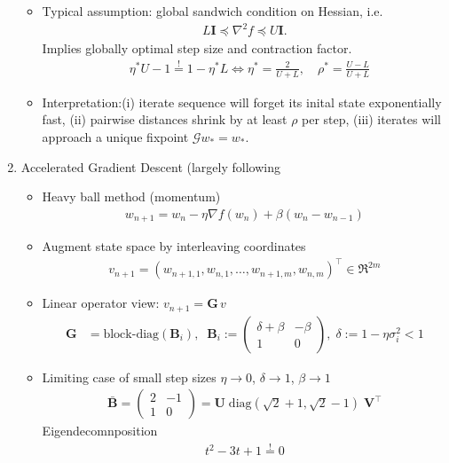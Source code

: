\documentclass{article}
\newcommand{\mI}{{\mathbf I}}
\newcommand{\mB}{{\mathbf B}}
\newcommand{\mG}{{\mathbf G}}
\newcommand{\mU}{{\mathbf U}}
\newcommand{\is}[1]{\setlength{\itemsep}{#1}}
\begin{document}
\begin{enumerate}
\begin{itemize}
\item Typical assumption: global sandwich condition on  Hessian, i.e.~
\begin{align}
L \mI \preceq \nabla^2 f \preceq U \mI.
\end{align}
Implies globally optimal step size and contraction factor. 
\begin{align}
& \eta^* U - 1 \stackrel != 1 - \eta^* L \iff \eta^* = \frac{2}{U+L}, \quad \rho^* = \frac{U-L}{U+L} 
\end{align}
\item Interpretation:(i) iterate sequence will forget its inital state exponentially fast, (ii) pairwise distances shrink by at least $\rho$ per step, (iii) iterates will approach a unique fixpoint $\mathcal G w_* = w_*$.
\end{itemize}
\item Accelerated Gradient Descent (largely following  \cite[Section VI]{jung2017fixed} 
\begin{itemize}\is{2mm}
\item Heavy ball method (momentum) 
\begin{align}
w_{n+1} = w_n - \eta \nabla f(w_n) + \beta (w_n - w_{n-1})
\end{align}
\item Augment state space by interleaving coordinates 
\begin{align}
v_{n+1} = (w_{n+1,1}, w_{n,1}, \dots, w_{n+1,m}, w_{n,m})^\top \in \Re^{2m} 
\end{align}
\item Linear operator view: $v_{n+1}  = \mG \,v$
\begin{align}
\mG &= \text{block-diag}(\mB_i), \;\;  \mB_i := \begin{pmatrix} \delta+\beta  & -\beta \\ 1 & 0 \end{pmatrix}, \; \delta :=1- \eta \sigma_i^2<1
\end{align}
\item Limiting case of small step sizes $\eta \to 0$, $\delta \to 1$, $\beta \to 1$
\begin{align}
\bar \mB = \begin{pmatrix} 2 & -1 \\ 1 & 0 \end{pmatrix} = \mU \; \text{diag}\left(\sqrt 2 +1, \sqrt{2}-1 \right)\; \mathbf V^\top 
\end{align}
Eigendecomnposition 
\begin{align}
t^2 - 3t + 1 \stackrel != 0 
\end{align}

\end{itemize}
\end{enumerate}
\end{document}
